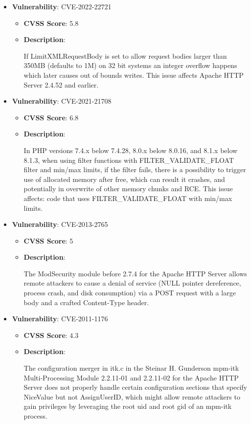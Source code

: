\documentclass{article}
\begin{document}
\begin{itemize}
        \item \textbf{Vulnerability}: CVE-2022-22721
        \begin{itemize}
            \item \textbf{CVSS Score}:  5.8 
            \item \textbf{Description}:
            \parbox[t]{0.9\linewidth}{
                \ttfamily If LimitXMLRequestBody is set to allow request bodies larger than 350MB (defaults to 1M) on 32 bit systems an integer overflow happens which later causes out of bounds writes. This issue affects Apache HTTP Server 2.4.52 and earlier.
            }
        \end{itemize}
    
        \item \textbf{Vulnerability}: CVE-2021-21708
        \begin{itemize}
            \item \textbf{CVSS Score}:  6.8 
            \item \textbf{Description}:
            \parbox[t]{0.9\linewidth}{
                \ttfamily In PHP versions 7.4.x below 7.4.28, 8.0.x below 8.0.16, and 8.1.x below 8.1.3, when using filter functions with FILTER\_VALIDATE\_FLOAT filter and min/max limits, if the filter fails, there is a possibility to trigger use of allocated memory after free, which can result it crashes, and potentially in overwrite of other memory chunks and RCE. This issue affects: code that uses FILTER\_VALIDATE\_FLOAT with min/max limits.
            }
        \end{itemize}
    
        \item \textbf{Vulnerability}: CVE-2013-2765
        \begin{itemize}
            \item \textbf{CVSS Score}:  5 
            \item \textbf{Description}:
            \parbox[t]{0.9\linewidth}{
                \ttfamily The ModSecurity module before 2.7.4 for the Apache HTTP Server allows remote attackers to cause a denial of service (NULL pointer dereference, process crash, and disk consumption) via a POST request with a large body and a crafted Content-Type header.
            }
        \end{itemize}
    
        \item \textbf{Vulnerability}: CVE-2011-1176
        \begin{itemize}
            \item \textbf{CVSS Score}:  4.3 
            \item \textbf{Description}:
            \parbox[t]{0.9\linewidth}{
                \ttfamily The configuration merger in itk.c in the Steinar H. Gunderson mpm-itk Multi-Processing Module 2.2.11-01 and 2.2.11-02 for the Apache HTTP Server does not properly handle certain configuration sections that specify NiceValue but not AssignUserID, which might allow remote attackers to gain privileges by leveraging the root uid and root gid of an mpm-itk process.
            }
        \end{itemize}
    

\end{itemize}
\end{document}
